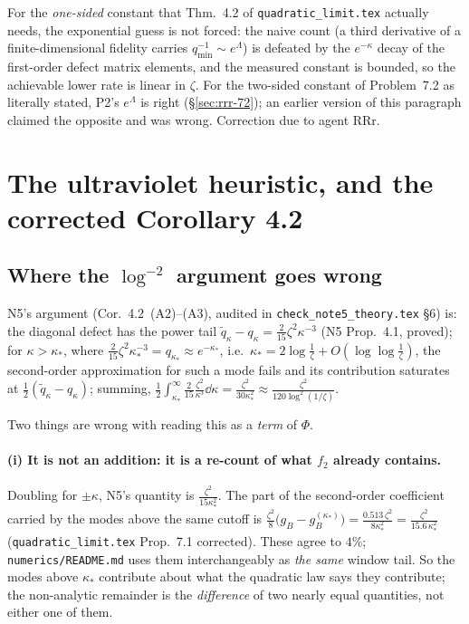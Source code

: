 \documentclass[11pt]{article}
\begin{document}
\begin{verdictok}
For the \emph{one-sided} constant that Thm.~4.2 of \texttt{quadratic\_limit.tex} actually needs, the
exponential guess is not forced: the naive count (a third derivative of a finite-dimensional
fidelity carries $q_{\min}^{-1}\sim e^\Lambda$) is defeated by the $e^{-\kappa}$ decay of the
first-order defect matrix elements, and the measured constant is bounded, so the achievable lower
rate is linear in $\zeta$.  For the two-sided constant of Problem~7.2 as literally stated, P2's
$e^\Lambda$ is right (\S\ref{sec:rrr-72}); an earlier version of this paragraph claimed the
opposite and was wrong.  Correction due to agent RRr.
\end{verdictok}

\section{The ultraviolet heuristic, and the corrected Corollary 4.2}\label{sec:uv}

\subsection{Where the $\log^{-2}$ argument goes wrong}

N5's argument (Cor.~4.2~(A2)--(A3), audited in \texttt{check\_note5\_theory.tex} \S6) is: the
diagonal defect has the power tail $\widetilde q_\kappa-q_\kappa=\frac2{15}\zeta^2\kappa^{-3}$
(N5 Prop.~4.1, proved); for $\kappa>\kappa_*$, where
$\frac2{15}\zeta^2\kappa_*^{-3}=q_{\kappa_*}\approx e^{-\kappa_*}$, i.e.\
$\kappa_*=2\log\frac1\zeta+O(\log\log\frac1\zeta)$, the second-order approximation for such a mode
fails and its contribution saturates at $\frac12(\widetilde q_\kappa-q_\kappa)$; summing,
$\frac12\int_{\kappa_*}^\infty\frac2{15}\frac{\zeta^2}{\kappa^3}\dd\kappa
=\frac{\zeta^2}{30\kappa_*^2}\approx\frac{\zeta^2}{120\log^2(1/\zeta)}$.

Two things are wrong with reading this as a \emph{term} of $\Phi$.

\paragraph{(i) It is not an addition: it is a re-count of what $f_2$ already contains.}
Doubling for $\pm\kappa$, N5's quantity is $\frac{\zeta^2}{15\kappa_*^2}$.  The part of the
second-order coefficient carried by the modes above the same cutoff is
$\frac{\zeta^2}8\bigl(g_B-g_B^{(\kappa_*)}\bigr)=\frac{0.513\,\zeta^2}{8\kappa_*^2}
=\frac{\zeta^2}{15.6\,\kappa_*^2}$ (\texttt{quadratic\_limit.tex} Prop.~7.1 corrected).  These
agree to $4\%$; \texttt{numerics/README.md} uses them interchangeably as \emph{the same} window
tail.  So the modes above $\kappa_*$ contribute about what the quadratic law says they contribute;
the non-analytic remainder is the \emph{difference} of two nearly equal quantities, not either one
of them.
\end{document}
